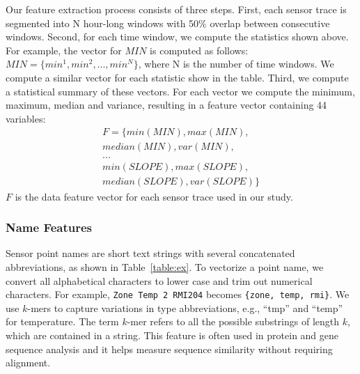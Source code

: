 Our feature extraction process consists of three steps.
First, each sensor trace is segmented into N hour-long windows with 50\% overlap between consecutive windows. Second, for each time window, we compute the statistics shown above. 
For example, the vector for $MIN$ is computed as follows: 
$MIN = \{min^{1}, min^{2}, ..., min^{N}\}$, where N is the number of time windows. We compute a similar vector for each statistic show in the table.
Third, we compute a statistical summary of these vectors. For each vector we compute the minimum, maximum, median and variance, resulting in a feature 
vector containing 44 variables:
\begin{displaymath}
\begin{split}
F = \{min(MIN), max(MIN), \\ 
median(MIN), var(MIN),\\
...\\
min(SLOPE), max(SLOPE), \\
median(SLOPE), var(SLOPE)\}
\end{split}
\end{displaymath}
$F$ is the data feature vector for each sensor trace used in our study.


\subsubsection{Name Features}
Sensor point names are short text strings with several concatenated abbreviations, as shown in Table~\ref{table:ex}. 
To vectorize a point name, we convert all alphabetical characters to lower case and trim out numerical characters. 
For example, \texttt{Zone Temp 2 RMI204} becomes \texttt{\{zone, temp, rmi\}}. 
We use $k$-mers \cite{leslie2004mismatch} to capture variations in type abbreviations, e.g., ``tmp'' and ``temp'' for temperature.
The term $k$-mer refers to all the possible substrings of length $k$, which are contained in a string. This feature is often used in protein and gene sequence analysis and 
it helps measure sequence similarity without requiring alignment. 

